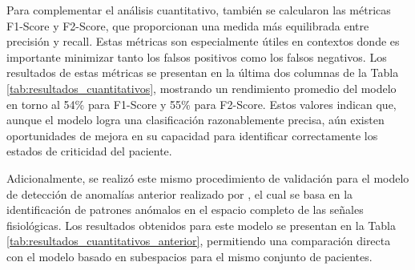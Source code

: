 Para complementar el análisis cuantitativo, también se calcularon las métricas F1-Score y F2-Score, que proporcionan una medida más equilibrada entre precisión y recall. Estas métricas son especialmente útiles en contextos donde es importante minimizar tanto los falsos positivos como los falsos negativos. Los resultados de estas métricas se presentan en la última dos columnas de la Tabla \ref{tab:resultados_cuantitativos}, mostrando un rendimiento promedio del modelo en torno al 54\% para F1-Score y 55\% para F2-Score. Estos valores indican que, aunque el modelo logra una clasificación razonablemente precisa, aún existen oportunidades de mejora en su capacidad para identificar correctamente los estados de criticidad del paciente.

Adicionalmente, se realizó este mismo procedimiento de validación para el modelo de detección de anomalías anterior realizado por \cite{Vargas2023}, el cual se basa en la identificación de patrones anómalos en el espacio completo de las señales fisiológicas. Los resultados obtenidos para este modelo se presentan en la Tabla \ref{tab:resultados_cuantitativos_anterior}, permitiendo una comparación directa con el modelo basado en subespacios para el mismo conjunto de pacientes.

